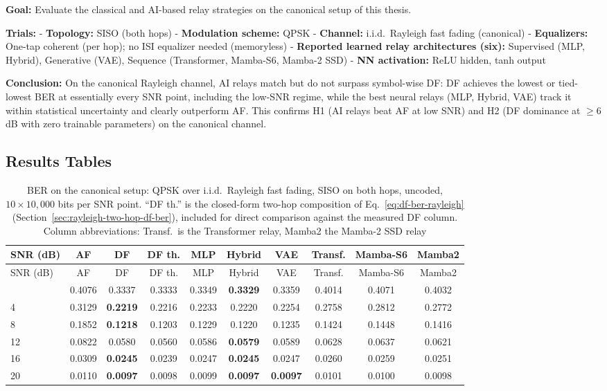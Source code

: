 \textbf{Goal:} Evaluate the classical and AI-based relay strategies on the canonical setup of this thesis.

\textbf{Trials:} - \textbf{Topology:} SISO (both hops) - \textbf{Modulation scheme:} QPSK - \textbf{Channel:} i.i.d.\ Rayleigh fast fading (canonical) - \textbf{Equalizers:} One-tap coherent (per hop); no ISI equalizer needed (memoryless) - \textbf{Reported learned relay architectures (six):} Supervised (MLP, Hybrid), Generative (VAE), Sequence (Transformer, Mamba-S6, Mamba-2 SSD) - \textbf{NN activation:} ReLU hidden, tanh output

\textbf{Conclusion:} On the canonical Rayleigh channel, AI relays match but do not surpass symbol-wise DF: DF achieves the lowest or tied-lowest BER at essentially every SNR point, including the low-SNR regime, while the best neural relays (MLP, Hybrid, VAE) track it within statistical uncertainty and clearly outperform AF. This confirms H1 (AI relays beat AF at low SNR) and H2 (DF dominance at $\geq 6$ dB with zero trainable parameters) on the canonical channel.

\subsection{Results Tables}\label{sec:results-tables}

\begingroup\footnotesize
\begin{longtable}[]{@{}lccccccccc@{}}
\caption[BER on the canonical setup]{BER on the canonical setup: QPSK over i.i.d.\ Rayleigh fast fading, SISO on both hops, uncoded, $10\times10{,}000$ bits per SNR point. ``DF th.'' is the closed-form two-hop composition of Eq.~\ref{eq:df-ber-rayleigh} (Section~\ref{sec:rayleigh-two-hop-df-ber}), included for direct comparison against the measured DF column. Column abbreviations: Transf.\ is the Transformer relay, Mamba2 the Mamba-2 SSD relay}\label{tbl:table2}\tabularnewline
\toprule\noalign{}
SNR (dB) & AF & DF & DF th. & MLP & Hybrid & VAE & Transf. & Mamba-S6 & Mamba2 \\
\midrule\noalign{}
\endfirsthead
\toprule\noalign{}
SNR (dB) & AF & DF & DF th. & MLP & Hybrid & VAE & Transf. & Mamba-S6 & Mamba2 \\
\midrule\noalign{}
\endhead
\bottomrule\noalign{}
\endlastfoot
0 & 0.4076 & 0.3337 & 0.3333 & 0.3349 & \textbf{0.3329} & 0.3359 & 0.4014 & 0.4071 & 0.4032 \\
4 & 0.3129 & \textbf{0.2219} & 0.2216 & 0.2233 & 0.2220 & 0.2254 & 0.2758 & 0.2812 & 0.2772 \\
8 & 0.1852 & \textbf{0.1218} & 0.1203 & 0.1229 & 0.1220 & 0.1235 & 0.1424 & 0.1448 & 0.1416 \\
12 & 0.0822 & 0.0580 & 0.0560 & 0.0586 & \textbf{0.0579} & 0.0589 & 0.0628 & 0.0637 & 0.0621 \\
16 & 0.0309 & \textbf{0.0245} & 0.0239 & 0.0247 & \textbf{0.0245} & 0.0247 & 0.0260 & 0.0259 & 0.0251 \\
20 & 0.0110 & \textbf{0.0097} & 0.0098 & 0.0099 & \textbf{0.0097} & \textbf{0.0097} & 0.0101 & 0.0100 & 0.0098 \\
\end{longtable}
\endgroup

